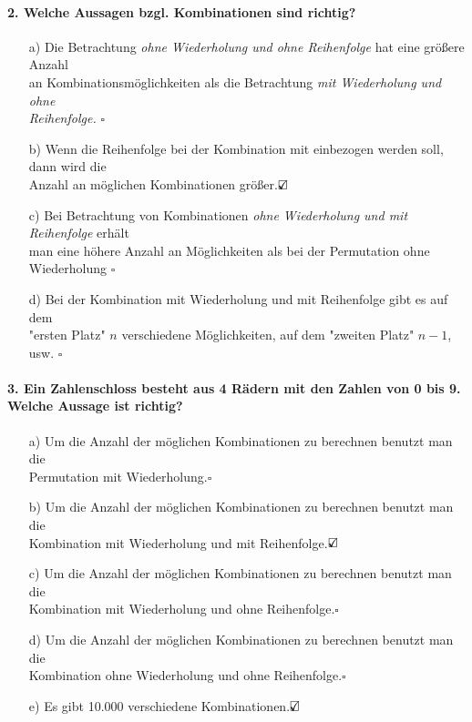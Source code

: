 \documentclass[a4paper]{article}
\begin{document}
\paragraph{2. Welche Aussagen bzgl. Kombinationen sind richtig?}
\begin{itemize}
    \item [a)] Die Betrachtung \textit{ohne Wiederholung und ohne Reihenfolge} hat eine größere Anzahl \\ an Kombinationsmöglichkeiten als die Betrachtung \textit{mit Wiederholung und ohne \\Reihenfolge.} \hfill $\square$
    \item[b)] Wenn die Reihenfolge bei der Kombination mit einbezogen werden soll, dann wird die \\Anzahl an möglichen Kombinationen größer.\hfill $\text{\rlap{$\checkmark$}}\square$
    \item[c)] Bei Betrachtung von Kombinationen \textit{ohne Wiederholung und mit Reihenfolge} erhält\\ man eine höhere Anzahl an Möglichkeiten als bei der Permutation ohne Wiederholung \hfill $\square$
    \item[d)] Bei der Kombination mit Wiederholung und mit Reihenfolge gibt es auf dem \\"ersten Platz" $n$ verschiedene Möglichkeiten, auf dem "zweiten Platz" $n-1$, usw. \hfill $\square$
\end{itemize}

\paragraph{3. Ein Zahlenschloss besteht aus 4 Rädern mit den Zahlen von 0 bis 9. Welche Aussage ist richtig?}
\begin{itemize}
    \item[a)] Um die Anzahl der möglichen Kombinationen zu berechnen benutzt man die\\ Permutation mit Wiederholung.\hfill $\square$
    \item[b)] Um die Anzahl der möglichen Kombinationen zu berechnen benutzt man die\\ Kombination mit Wiederholung und mit Reihenfolge.\hfill $\text{\rlap{$\checkmark$}}\square$
    \item[c)] Um die Anzahl der möglichen Kombinationen zu berechnen benutzt man die\\ Kombination mit Wiederholung und ohne Reihenfolge.\hfill $\square$
    \item[d)] Um die Anzahl der möglichen Kombinationen zu berechnen benutzt man die\\ Kombination ohne Wiederholung und ohne Reihenfolge.\hfill $\square$
    \item[e)] Es gibt 10.000 verschiedene Kombinationen.\hfill $\text{\rlap{$\checkmark$}}\square$
\end{itemize}
\end{document}
